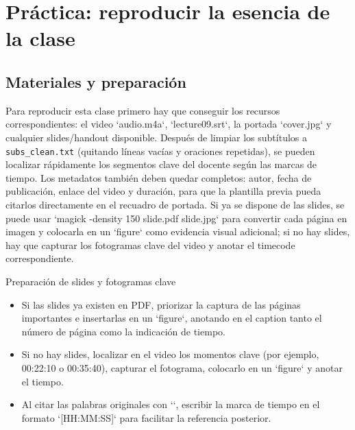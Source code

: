 \section{Práctica: reproducir la esencia de la clase}

\subsection{Materiales y preparación}
Para reproducir esta clase primero hay que conseguir los recursos correspondientes: el video `audio.m4a`, `lecture09.srt`, la portada `cover.jpg` y cualquier slides/handout disponible. Después de limpiar los subtítulos a \texttt{subs\_clean.txt} (quitando líneas vacías y oraciones repetidas), se pueden localizar rápidamente los segmentos clave del docente según las marcas de tiempo. Los metadatos también deben quedar completos: autor, fecha de publicación, enlace del video y duración, para que la plantilla previa pueda citarlos directamente en el recuadro de portada. Si ya se dispone de las slides, se puede usar `magick -density 150 slide.pdf slide.jpg` para convertir cada página en imagen y colocarla en un `figure` como evidencia visual adicional; si no hay slides, hay que capturar los fotogramas clave del video y anotar el timecode correspondiente.

\begin{knowledgebox}{Preparación de slides y fotogramas clave}
\begin{itemize}
    \item Si las slides ya existen en PDF, priorizar la captura de las páginas importantes e insertarlas en un `figure`, anotando en el caption tanto el número de página como la indicación de tiempo.
    \item Si no hay slides, localizar en el video los momentos clave (por ejemplo, 00:22:10 o 00:35:40), capturar el fotograma, colocarlo en un `figure` y anotar el tiempo.
    \item Al citar las palabras originales con `\textit{}`, escribir la marca de tiempo en el formato `[HH:MM:SS]` para facilitar la referencia posterior.
\end{itemize}
\end{knowledgebox}

